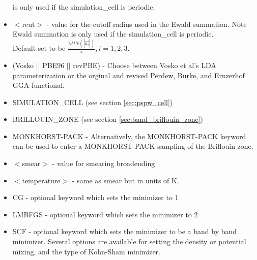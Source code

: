 \begin{itemize}
                          is only used if the simulation\_cell is periodic.
        \item $<$rcut$>$ - value for the cutoff radius used
                          in the Ewald summation. Note Ewald summation
                          is only used if the simulation\_cell is periodic. \\
                           Default set to be
                          $\frac{MIN(\left| \vec{a_i} \right|)}{\pi}, i=1,2,3$.
        \item (Vosko $||$ PBE96 $||$ revPBE) - Choose between Vosko et al's LDA 
                               parameterization or the orginal and revised Perdew, Burke, 
                               and Ernzerhof GGA functional.
        \item SIMULATION\_CELL (see section \ref{sec:pspw_cell})
        \item BRILLOUIN\_ZONE  (see section \ref{sec:band_brillouin_zone})
        \item MONKHORST-PACK - Alternatively, the MONKHORST-PACK keyword can be used 
                               to enter a MONKHORST-PACK sampling of the Brillouin zone.
        \item $<$smear$>$ - value for smearing broadending
        \item $<$temperature$>$ - same as smear but in units of K.
        \item CG - optional keyword which sets the minimizer to 1
        \item LMBFGS - optional keyword which sets the minimizer to 2
        \item SCF - optional keyword which sets the minimizer to be a band by band minimizer.  Several
                    options are available for setting the density or potential mixing, and the type of
                    Kohn-Sham minimizer.
\end{itemize}


